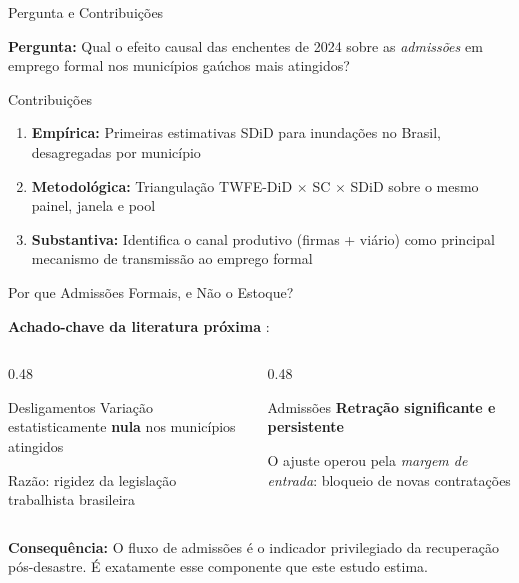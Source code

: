 \documentclass[11pt, aspectratio=169]{beamer}
\begin{document}
\begin{frame}[shrink=20]{Pergunta e Contribuições}

\textbf{Pergunta:} Qual o efeito causal das enchentes de 2024 sobre as \emph{admissões} em emprego formal nos municípios gaúchos mais atingidos?

\medskip

\begin{block}{Contribuições}
  \begin{enumerate}
    \item \textbf{Empírica:} Primeiras estimativas SDiD para inundações no Brasil, desagregadas por município
    \item \textbf{Metodológica:} Triangulação TWFE-DiD $\times$ SC $\times$ SDiD sobre o mesmo painel, janela e pool
    \item \textbf{Substantiva:} Identifica o canal produtivo (firmas + viário) como principal mecanismo de transmissão ao emprego formal
  \end{enumerate}
\end{block}

\end{frame}

\begin{frame}{Por que Admissões Formais, e Não o Estoque?}

\textbf{Achado-chave da literatura próxima} \cite{teixeira2024}:

\medskip

\begin{columns}[T]
\begin{column}{0.48\textwidth}
  \begin{block}{Desligamentos}
    Variação estatisticamente \textbf{nula} nos municípios atingidos

    \smallskip
    Razão: rigidez da legislação trabalhista brasileira
  \end{block}
\end{column}
\begin{column}{0.48\textwidth}
  \begin{alertblock}{Admissões}
    \textbf{Retração significante e persistente}

    \smallskip
    O ajuste operou pela \emph{margem de entrada}: bloqueio de novas contratações
  \end{alertblock}
\end{column}
\end{columns}

\medskip
\textbf{Consequência:} O fluxo de admissões é o indicador privilegiado da recuperação pós-desastre. É exatamente esse componente que este estudo estima.

\end{frame}
\end{document}
